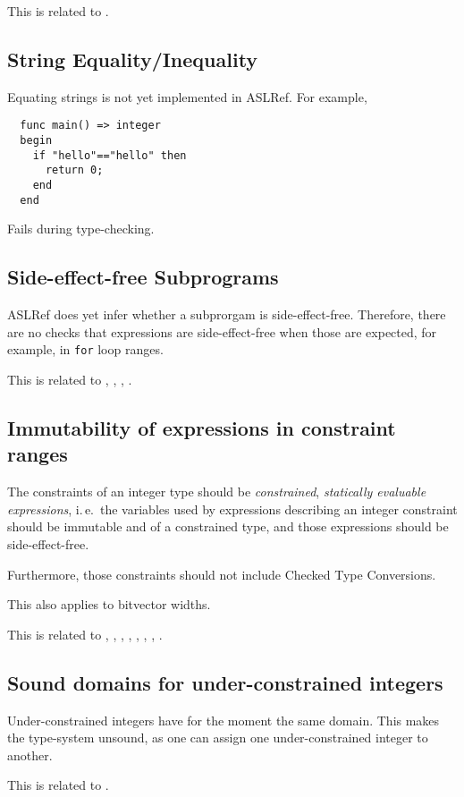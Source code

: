 \documentclass{book}
\begin{document}
This is related to .

\subsection{String Equality/Inequality}
Equating strings is not yet implemented in ASLRef.
For example,
\begin{Verbatim}
  func main() => integer
  begin
    if "hello"=="hello" then
      return 0;
    end
  end
\end{Verbatim}
Fails during type-checking.

\subsection{Side-effect-free Subprograms}
ASLRef does yet infer whether a subprorgam is side-effect-free.
Therefore, there are no checks that expressions are side-effect-free when those are expected,
for example, in \texttt{for} loop ranges.

This is related to , , , .

\subsection{Immutability of expressions in constraint ranges}

The constraints of an integer type should be \emph{constrained},
\emph{statically evaluable expressions}, i.\,e.\ the variables used by
expressions describing an integer constraint should be immutable and of a
constrained type, and those expressions should be side-effect-free.

Furthermore, those constraints should not include Checked Type Conversions.

This also applies to bitvector widths.

This is related to , , , ,
, , , .

\subsection{Sound domains for under-constrained integers}

Under-constrained integers have for the moment the same domain.
%
This makes the type-system unsound, as one can assign one under-constrained
integer to another.
%

This is related to .
\end{document}
